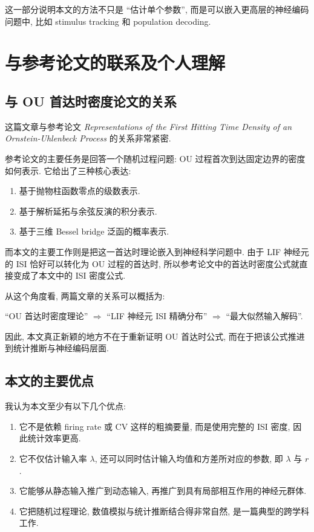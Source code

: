 \documentclass[oneside]{ctexart}
\begin{document}
这一部分说明本文的方法不只是 ``估计单个参数'', 而是可以嵌入更高层的神经编码问题中, 比如 stimulus tracking 和 population decoding.

\section{与参考论文的联系及个人理解}

\subsection{与 OU 首达时密度论文的关系}

这篇文章与参考论文 \textit{Representations of the First Hitting Time Density of an Ornstein-Uhlenbeck Process} 的关系非常紧密.

参考论文的主要任务是回答一个随机过程问题: OU 过程首次到达固定边界的密度如何表示. 它给出了三种核心表达:

\begin{enumerate}[(1)]
    \item 基于抛物柱函数零点的级数表示.
    \item 基于解析延拓与余弦反演的积分表示.
    \item 基于三维 Bessel bridge 泛函的概率表示.
\end{enumerate}

而本文的主要工作则是把这一首达时理论嵌入到神经科学问题中. 由于 LIF 神经元的 ISI 恰好可以转化为 OU 过程的首达时, 所以参考论文中的首达时密度公式就直接变成了本文中的 ISI 密度公式.

从这个角度看, 两篇文章的关系可以概括为:

\begin{center}
    ``OU 首达时密度理论'' $\Longrightarrow$ ``LIF 神经元 ISI 精确分布'' $\Longrightarrow$ ``最大似然输入解码''.
\end{center}

因此, 本文真正新颖的地方不在于重新证明 OU 首达时公式, 而在于把该公式推进到统计推断与神经编码层面.

\subsection{本文的主要优点}

我认为本文至少有以下几个优点:

\begin{enumerate}[(1)]
    \item 它不是依赖 firing rate 或 CV 这样的粗摘要量, 而是使用完整的 ISI 密度, 因此统计效率更高.
    \item 它不仅估计输入率 $\lambda$, 还可以同时估计输入均值和方差所对应的参数, 即 $\lambda$ 与 $r$.
    \item 它能够从静态输入推广到动态输入, 再推广到具有局部相互作用的神经元群体.
    \item 它把随机过程理论, 数值模拟与统计推断结合得非常自然, 是一篇典型的跨学科工作.
\end{enumerate}
\end{document}
